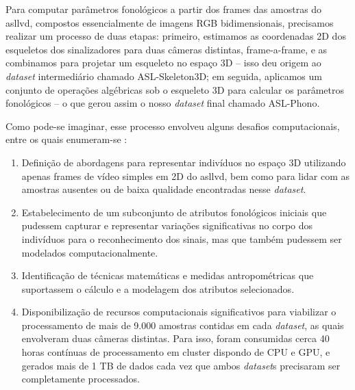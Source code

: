 Para computar parâmetros fonológicos a partir dos frames das amostras do \acrshort{asllvd}, compostos essencialmente de imagens RGB bidimensionais, precisamos realizar um processo de duas etapas: primeiro, estimamos as coordenadas 2D dos esqueletos dos sinalizadores para duas câmeras distintas, frame-a-frame, e as combinamos para projetar um esqueleto no espaço 3D -- isso deu origem ao \textit{dataset} intermediário chamado ASL-Skeleton3D; em seguida, aplicamos um conjunto de operações algébricas sob o esqueleto 3D para calcular os parâmetros fonológicos -- o que gerou assim o nosso \textit{dataset} final chamado ASL-Phono.

Como pode-se imaginar, esse processo envolveu alguns desafios computacionais, entre os quais enumeram-se :

\begin{enumerate}
    \item Definição de abordagens para representar indivíduos no espaço 3D utilizando apenas frames de vídeo simples em 2D do \acrshort{asllvd}, bem como para lidar com as amostras ausentes ou de baixa qualidade encontradas nesse \textit{dataset}.

    \item Estabelecimento de um subconjunto de atributos fonológicos iniciais que pudessem capturar e representar variações significativas no corpo dos indivíduos para o reconhecimento dos sinais, mas que também pudessem ser modelados computacionalmente.
    
    \item Identificação de técnicas matemáticas e medidas antropométricas que suportassem o cálculo e a modelagem dos atributos selecionados.
    
    \item Disponibilização de recursos computacionais significativos para viabilizar o processamento de mais de 9.000 amostras contidas em cada \textit{dataset}, as quais envolveram duas câmeras distintas. Para isso, foram consumidas cerca 40 horas contínuas de processamento em cluster dispondo de CPU e GPU, e gerados mais de 1 TB de dados cada vez que ambos \textit{dataset}s precisaram ser completamente processados.
\end{enumerate}





